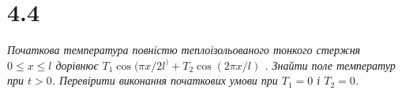 

%


\section[Задача №4.4]{4.4}

\textit{Початкова температура повністю теплоізольованого тонкого стержня\\ $0 \leq x \leq l$ дорівнює $T_1 \cos(\pi x/2l^) + T_2 \cos(2\pi x/l)$ . Знайти поле температур при $t > 0$. Перевірити виконання початкових умови при $T_1 = 0$ і $T_2 = 0$.}

%
